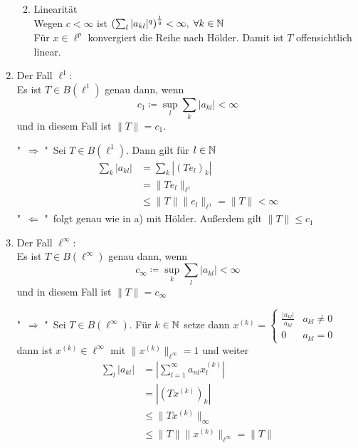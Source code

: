 \begin{beispiel}[Matrizenmultiplikation]
\begin{enumerate}[label=\alph*\upshape)]
\begin{beweis}
\begin{enumerate}
\begin{align*}
					\end{align*}
				\item Linearität \\
					Wegen $c < \infty$ ist $\left( \sum_{l} |a_{kl}|^{q} \right)^{\frac{1}{q}} < \infty, \hspace{0.1cm} \forall k \in \mathbb{N}$ \\
					Für $x \in \ell^{p}$ konvergiert die Reihe nach Hölder. Damit ist $T$ offensichtlich linear.
			\end{enumerate}
		\end{beweis}
	\item Der Fall $\ell^{1}$: \\
		Es ist $T \in B(\ell^{1})$ genau dann, wenn 
		\[ c_{1} \coloneqq \sup_{l} \sum_{k} | a_{kl} | < \infty \]
		und in diesem Fall ist $\| T \| = c_{1}$.
		\begin{beweis}
			"\ $\Rightarrow$ "\  Sei $T \in B(\ell^{1})$. Dann gilt für $l \in \mathbb{N}$
			\begin{align*}
				\sum_{k} | a_{kl} | &= \sum_{k} |(Te_{l})_{k}| \\
								  	&= \| T e_{l} \|_{\ell^{1}}  \\
								  	& \leq \| T \| \| e_{l} \|_{\ell^1} = \| T \| < \infty 
			\end{align*}
			"\ $\Leftarrow$ "\  folgt genau wie in a) mit Hölder. Au{\ss}erdem gilt $\| T \| \leq c_{1}$			
		\end{beweis}
	\item Der Fall $\ell^{\infty}$: \\
		Es ist $T \in B(\ell^{\infty})$ genau dann, wenn
		\[ c_{\infty} \coloneqq \sup_{k} \sum_{l} |a_{kl}| < \infty \]
		und in diesem Fall ist $\| T \| = c_{\infty}$
		\begin{beweis}
			"\ $\Rightarrow$ "\  Sei $T \in B(\ell^{\infty})$.  Für $k \in \mathbb{N}$ setze dann $x^{(k)} = \begin{cases} \frac{|a_{kl}|}{a_{kl}} & a_{kl} \neq 0 \\ 0 & a_{kl} = 0 \end{cases}$ \\
			dann ist $x^{(k)} \in \ell^{\infty}$ mit $\| x^{(k)} \|_{\ell^{\infty}} = 1$ und weiter
			\begin{align*}
				\sum_{l} |a_{kl}| & = | \sum_{l = 1}^{\infty} a_{nl} x_{l}^{(k)} | \\
								  & = | ( T x^{(k)} )_{k} | \\
								  & \leq \| T x^{(k)} \|_{\infty} \\
								  & \leq \| T \| \| x^{(k)} \|_{\ell^{\infty}} = \| T \|

\end{align*}
\end{beweis}
\end{enumerate}
\end{beispiel}
